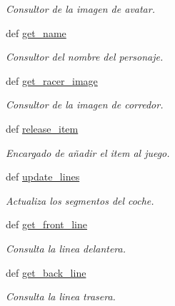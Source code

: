 \begin{DoxyCompactItemize}
\begin{DoxyCompactList}\small\item\em \-Consultor de la imagen de avatar. \end{DoxyCompactList}\item 
def \hyperlink{classengine_1_1basiccar_1_1BasicCar_a7e00f9beb117b14af1321701d943d62f}{get\-\_\-name}
\begin{DoxyCompactList}\small\item\em \-Consultor del nombre del personaje. \end{DoxyCompactList}\item 
def \hyperlink{classengine_1_1basiccar_1_1BasicCar_ac7dc612688078acb3486df5301e56122}{get\-\_\-racer\-\_\-image}
\begin{DoxyCompactList}\small\item\em \-Consultor de la imagen de corredor. \end{DoxyCompactList}\item 
def \hyperlink{classengine_1_1basiccar_1_1BasicCar_ad0ad8ffbd7a90fa5c457b1b83902d41d}{release\-\_\-item}
\begin{DoxyCompactList}\small\item\em \-Encargado de añadir el item al juego. \end{DoxyCompactList}\item 
\hypertarget{classengine_1_1basiccar_1_1BasicCar_af2b97f5f58406e277a3ce653e429026a}{
def \hyperlink{classengine_1_1basiccar_1_1BasicCar_af2b97f5f58406e277a3ce653e429026a}{update\-\_\-lines}}
\label{classengine_1_1basiccar_1_1BasicCar_af2b97f5f58406e277a3ce653e429026a}

\begin{DoxyCompactList}\small\item\em \-Actualiza los segmentos del coche. \end{DoxyCompactList}\item 
def \hyperlink{classengine_1_1basiccar_1_1BasicCar_ab74c93eeeb491c26978a376fc0bf2819}{get\-\_\-front\-\_\-line}
\begin{DoxyCompactList}\small\item\em \-Consulta la linea delantera. \end{DoxyCompactList}\item 
def \hyperlink{classengine_1_1basiccar_1_1BasicCar_ae99bb9c24994969bcc7ee19995ce7be3}{get\-\_\-back\-\_\-line}
\begin{DoxyCompactList}\small\item\em \-Consulta la linea trasera. \end{DoxyCompactList}\end{DoxyCompactItemize}
